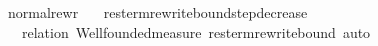 \ normal{\isacharunderscore}rewr\isanewline
\ \ \ res{\isacharunderscore}term{\isacharunderscore}rewrite{\isacharunderscore}bound{\isacharunderscore}step{\isacharunderscore}decrease\isanewline
\ \ \ {\isacharparenleft}relation\ {\isachardoublequoteopen}Wellfounded{\isachardot}measure\ res{\isacharunderscore}term{\isacharunderscore}rewrite{\isacharunderscore}bound{\isachardoublequoteclose}{\isacharcomma}\ auto{\isacharparenright}%
